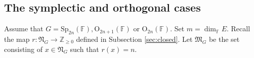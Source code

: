 \documentclass[12pt]{amsart}
\newtheorem{cor}[lm]{Corollary}
\theoremstyle{definition}
\theoremstyle{remark}\newtheorem{rmk}[lm]{Remark}
\newcommand{\RO}{{\mathrm {O}}}
\newcommand{\Sp}{{\mathrm{Sp}}}
\newcommand{\tr}{{\mathrm{tr}}}
\newcommand{\g}{\mathfrak g}
\newcommand{\gl}{\mathfrak g \mathfrak l}
\newcommand{\fM}{\mathfrak M}
\newcommand{\fN}{\mathfrak N}
\newcommand{\Z}{\mathbb{Z}}
\newcommand{\C}{\mathbb{F}}
\begin{document}
   
%		
%		
%		
		
	\subsection{The symplectic and orthogonal cases}
    \label{section:closedmaximal}
	 Assume that $G=\Sp_{2n}(\C),\RO_{2n+1}(\C)$ or $\RO_{2n}(\C)$. Set $m=\dim_{\C}E$. Recall the map $r:\fN_G\to\Z_{\geq 0}$ defined in Subsection \ref{sec:closed}. Let $\fM_G$ be the set consisting of $x\in\fN_G$ such that $r(x)=n$.
	
\end{document}
